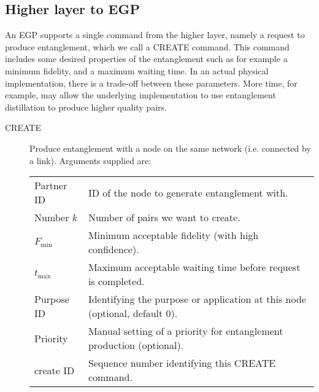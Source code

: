 \documentclass{article}
\begin{document}
\subsection{Higher layer to EGP}
An EGP supports a single command from the higher layer, namely a request to produce entanglement, which we call a CREATE command.
This command includes some desired properties of the entanglement such as for example a minimum fidelity, and a maximum waiting time.
In an actual physical implementation, there is a trade-off between these parameters. More time, for example, may allow the underlying
implementation to use entanglement distillation to produce higher quality pairs.
\begin{description}
\item[CREATE] Produce entanglement with a node on the same network (i.e. connected by a link). Arguments supplied are:\\
\noindent
\begin{tabular}{ll}
Partner ID & ID of the node to generate entanglement with. \\
Number $k$ & Number of pairs we want to create.\\
$F_{\min}$ & Minimum acceptable fidelity (with high confidence). \\
$t_{\max}$ & Maximum acceptable waiting time before request is completed. \\
Purpose ID & Identifying the purpose or application at this node (optional, default 0). \\
Priority & Manual setting of a priority for entanglement production (optional).\\
create ID & Sequence number identifying this CREATE command.
\end{tabular}
\end{description}
\end{document}
